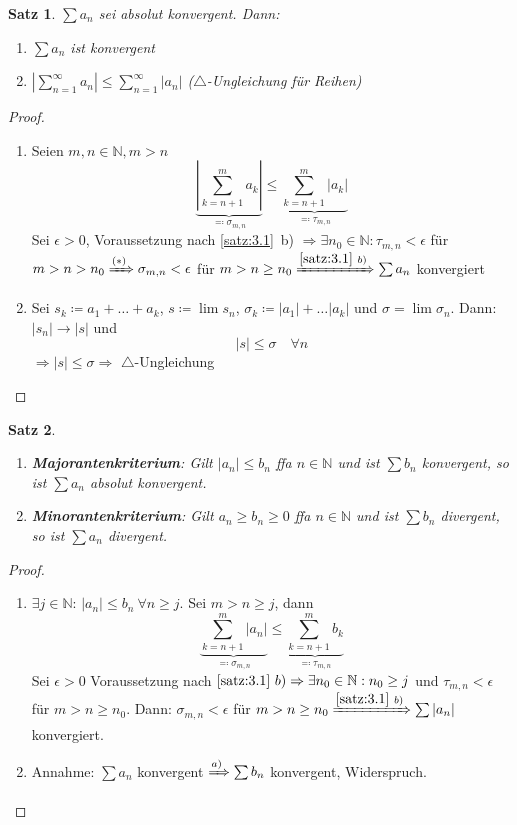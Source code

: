 \documentclass[titlepage,ngerman,a4paper,headsepline,DIV15,halfparskip*,14pt]{scrartcl}
\newcommand{\N}{\mathbb{N}}
\theoremstyle{dotless}
\newtheorem{satz}{Satz}[section]
\begin{document}
\begin{satz} \label{satz:3.4}
	$\sum a_{n}$ sei absolut konvergent. Dann:
	\begin{enumerate}
		\item $\sum a_{n}$ ist konvergent
		\item $|\sum_{n=1}^{\infty} a_{n}| \leq \sum_{n=1}^{\infty} |a_{n}|$ ($\triangle$-Ungleichung für Reihen)
	\end{enumerate}
\end{satz}

\begin{proof} ~\
	\begin{enumerate}
		\item Seien $m,n \in \N, m > n$
			\[ \underbrace{| \sum_{k = n+1}^{m} a_{k} |}_{\eqqcolon \sigma_{m, n}} \leq \underbrace{\sum_{k = n+1}^{m}|a_{k}|}_{\eqqcolon \tau_{m, n}} \tag*{$(*)$} \]
			Sei $\epsilon > 0$, Voraussetzung nach \ref{satz:3.1}~b) $\Rightarrow \exists n_{0} \in \N: \tau_{m, n} < \epsilon$ für $m > n > n_{0} \xRightarrow[]{(*)} \sigma_{m, n} < \epsilon$ für $m > n \geq n_{0} \xRightarrow[]{\ref{satz:3.1}~b)} \sum a_{n}$ konvergiert
		\item Sei $s_{k} \coloneqq a_{1} + \dotsc + a_{k}$, $s \coloneqq \lim s_{n}$, $\sigma_{k} \coloneqq |a_{1}| + \dotsc |a_{k}|$ und $\sigma = \lim \sigma_{n}$. Dann: $|s_{n}| \rightarrow |s|$ und 
			$$ |s| \leq \sigma \quad \forall n $$
			$\Rightarrow |s| \leq \sigma \Rightarrow$ $\triangle$-Ungleichung
	\end{enumerate}
\end{proof}

 
\begin{satz} ~\ \label{satz:3.5}
	\begin{enumerate}
		\item \textbf{Majorantenkriterium}: Gilt $|a_{n}| \leq b_{n}$ ffa $n \in \N$ und ist $\sum b_{n}$ konvergent, so ist $\sum a_{n}$ absolut konvergent.
		\item \textbf{Minorantenkriterium}: Gilt $a_{n} \geq b_{n} \geq 0$ ffa $n \in \N$ und ist $\sum b_{n}$ divergent, so ist $\sum a_{n}$ divergent.
	\end{enumerate}
\end{satz}

\begin{proof} ~\
	\begin{enumerate}
		\item $\exists j \in \N$: $|a_{n}| \leq b_{n} ~\forall n \geq j$. Sei $m > n \geq j$, dann
			\[ \underbrace{\sum_{k=n+1}^{m}|a_{n}|}_{\eqqcolon \sigma_{m, n}} \leq \underbrace{\sum_{k=n+1}^{m} b_{k}}_{\eqqcolon \tau_{m,n}}  \]
			Sei $\epsilon > 0$ Voraussetzung nach $\ref{satz:3.1}~b) \Rightarrow \exists n_{0} \in \N: n_{0} \geq j$ und $\tau_{m,n} < \epsilon$ für $m > n \geq n_{0}$. Dann: $\sigma_{m,n} < \epsilon$ für $m > n \geq n_{0} \xRightarrow[]{\ref{satz:3.1}~b)} \sum |a_{n}|$ konvergiert.
		\item Annahme: $\sum a_{n}$ konvergent $\xRightarrow[]{a)} \sum b_{n}$ konvergent, Widerspruch.
	\end{enumerate}	
\end{proof}
\end{document}
